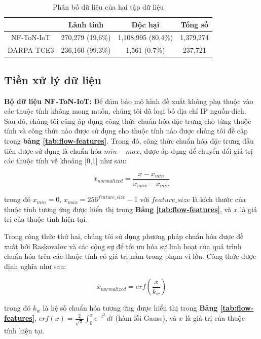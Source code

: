 \begin{table}[h]
\centering
\caption{Phân bố dữ liệu của hai tập dữ liệu}
\begin{tabular}{|c|c|c|c|}
\hline
           & Lành tính        & Độc hại            & Tổng số   \\ \hline
NF-ToN-IoT & 270,279 (19,6\%) & 1,108,995 (80,4\%) & 1,379,274 \\ \hline
DARPA TCE3 & 236,160 (99.3\%) & 1,561 (0.7\%)      & 237,721   \\ \hline
\end{tabular}
\end{table}


\subsection{Tiền xử lý dữ liệu}

\textbf{Bộ dữ liệu NF-ToN-IoT:} Để đảm bảo mô hình đề xuất không phụ thuộc vào các thuộc tính không mong muốn, chúng tôi đã loại bỏ địa chỉ IP nguồn-đích. Sau đó, chúng tôi cũng áp dụng công thức chuẩn hóa đặc trưng cho từng thuộc tính và công thức nào được sử dụng cho thuộc tính nào được chúng tôi đề cập trong \textbf{bảng \ref{tab:flow-features}}. Trong đó, công thức chuẩn hóa đặc trưng đầu tiên được sử dụng là chuẩn hóa $min-max$, được áp dụng để chuyển đổi giá trị các thuộc tính về khoảng [0,1] như sau:

\begin{equation} \label{eq:mix&max-normalized}
    x_{normalized} = \frac{x-x_{min}}{x_{max}-x_{min}}
\end{equation}

\bigbreak\noindent
trong đó $x_{min}=0$, $x_{max}=256^{feature\_size}-1$ với $feature\_size$ là kích thước của thuộc tính tương ứng được hiển thị trong \textbf{Bảng \ref{tab:flow-features}}, và $x$ là giá trị của thuộc tính hiện tại.

\bigbreak\noindent
Trong công thức thứ hai, chúng tôi sử dụng phương pháp chuẩn hóa được đề xuất bởi Raskovalov và các cộng sự \cite{raskovalov2022investigation} để tối ưu hóa sự linh hoạt của quá trình chuẩn hóa trên các thuộc tính có giá trị nằm trong phạm vi lớn. Công thức được định nghĩa như sau:

\begin{equation} \label{eq:erf-normalized}
    x_{normalized} = erf(\frac{x}{k_w})
\end{equation}

\bigbreak\noindent
trong đó $k_w$ là hệ số chuẩn hóa tương ứng được hiển thị trong \textbf{Bảng \ref{tab:flow-features}}, $erf(x)= \frac{2}{\sqrt{\pi}} \int_{0}^{x} e^{-t^2} \, dt$ (hàm lỗi Gauss), và $x$ là giá trị của thuộc tính hiện tại.

